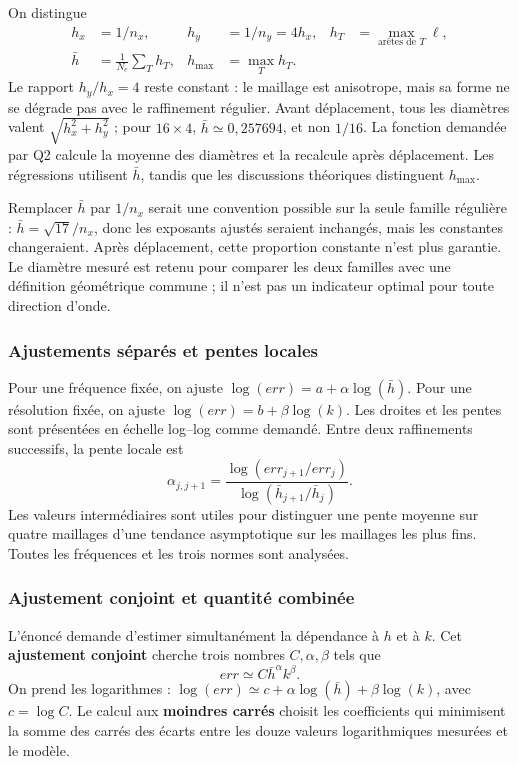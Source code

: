 \documentclass[12pt,a4paper]{article}
\newcommand{\tabfont}{\fontsize{11pt}{13.2pt}\selectfont\setlength{\tabcolsep}{4pt}}
\newcommand{\resulttable}[2]{\begin{table}[htbp]\centering\tabfont\caption{#2}\end{table}}
\begin{document}
On distingue
\begin{align*}
h_x&=1/n_x, & h_y&=1/n_y=4h_x, &h_T&=\max_{\text{arêtes de }T}\ell,\\
\bar h&=\frac1{N_e}\sum_T h_T, &h_{\max}&=\max_T h_T.
\end{align*}
Le rapport $h_y/h_x=4$ reste constant : le maillage est anisotrope, mais sa forme ne se dégrade pas avec le raffinement régulier. Avant déplacement, tous les diamètres valent $\sqrt{h_x^2+h_y^2}$ ; pour $16\times4$, $\bar h\simeq0,257694$, et non $1/16$. La fonction demandée par Q2 calcule la moyenne des diamètres et la recalcule après déplacement. Les régressions utilisent $\bar h$, tandis que les discussions théoriques distinguent $h_{\max}$.

Remplacer $\bar h$ par $1/n_x$ serait une convention possible sur la seule famille régulière : $\bar h=\sqrt{17}/n_x$, donc les exposants ajustés seraient inchangés, mais les constantes changeraient. Après déplacement, cette proportion constante n'est plus garantie. Le diamètre mesuré est retenu pour comparer les deux familles avec une définition géométrique commune ; il n'est pas un indicateur optimal pour toute direction d'onde.
\resulttable{regular_geometry.tex}{Géométrie et résidu relatif maximal sur les trois fréquences.}
\resulttable{shifted_geometry.tex}{Diamètre moyen et diamètre maximal après déplacement ; même nombre de degrés de liberté.}

\subsubsection{Ajustements séparés et pentes locales}
Pour une fréquence fixée, on ajuste $\log(err)=a+\alpha\log(\bar h)$. Pour une résolution fixée, on ajuste $\log(err)=b+\beta\log(k)$. Les droites et les pentes sont présentées en échelle log--log comme demandé. Entre deux raffinements successifs, la pente locale est
\begin{equation*}
\alpha_{j,j+1}=\frac{\log(err_{j+1}/err_j)}{\log(\bar h_{j+1}/\bar h_j)}.
\end{equation*}
Les valeurs intermédiaires sont utiles pour distinguer une pente moyenne sur quatre maillages d'une tendance asymptotique sur les maillages les plus fins. Toutes les fréquences et les trois normes sont analysées.

\subsubsection{Ajustement conjoint et quantité combinée}
L'énoncé \cite{femproject} demande d'estimer simultanément la dépendance à $h$ et à $k$. Cet \textbf{ajustement conjoint} cherche trois nombres $C,\alpha,\beta$ tels que
\begin{equation*}
err\simeq C\bar h^\alpha k^\beta.
\end{equation*}
On prend les logarithmes : $\log(err)\simeq c+\alpha\log(\bar h)+\beta\log(k)$, avec $c=\log C$. Le calcul aux \textbf{moindres carrés} choisit les coefficients qui minimisent la somme des carrés des écarts entre les douze valeurs logarithmiques mesurées et le modèle.
\end{document}
